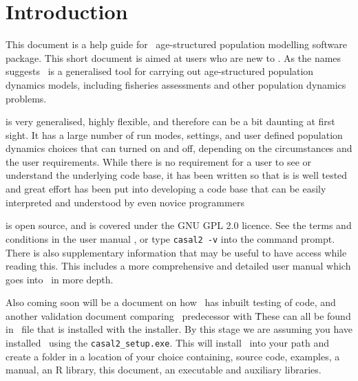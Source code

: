 \section{Introduction}\label{sec:introduction}

This document is a help guide for \CNAME\, age-structured population modelling software package. This short document is aimed at users who are new to \CNAME. As the names suggests \CNAME\ is a generalised tool for carrying out age-structured population dynamics models, including fisheries assessments and other population dynamics problems. 

\CNAME is very generalised, highly flexible, and therefore can be a bit daunting at first sight. It has a large number of run modes, settings, and user defined population dynamics choices that can turned on and off, depending on the circumstances and the user requirements. While there is no requirement for a user to see or understand the underlying code base, it has been written so that is is well tested and great effort has been put into developing a code base that can be easily interpreted and understood by even novice programmers

\CNAME is open source, and is covered under the GNU GPL 2.0 licence. See the terms and conditions in the user manual \citep{CASAL2}, or type \texttt{casal2 -v} into the command prompt. There is also supplementary information that may be useful to have access while reading this. This includes a more comprehensive and detailed user manual which goes into \CNAME\ in more depth. 

Also coming soon will be a document on how \CNAME\ has inbuilt testing of code, and another validation document comparing \CNAME\ predecessor with \CNAME\. These can all be found in \CNAME\ file that is installed with the installer. By this stage we are assuming you have installed \CNAME\ using the \texttt{casal2\_setup.exe}. This will install \CNAME\ into your path and create a folder in a location of your choice containing, source code, examples, a manual, an R library, this document, an executable and auxiliary libraries.
